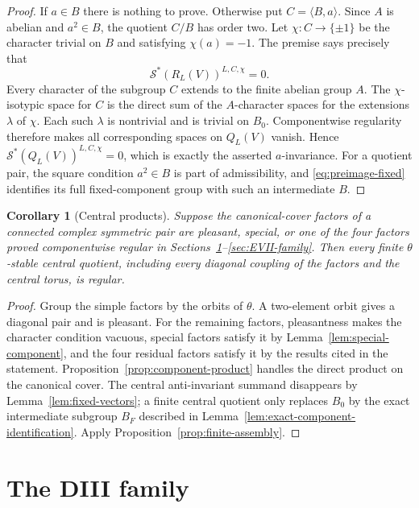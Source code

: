 \documentclass[10pt,a4paper]{amsart}
\numberwithin{equation}{section}
\newtheorem{corollary}[theorem]{Corollary}
\newcommand{\cS}{\mathcal S}
\begin{document}
\begin{proof}
If $a\in B$ there is nothing to prove.  Otherwise put $C=\langle B,a\rangle$.
Since $A$ is abelian and $a^2\in B$, the quotient $C/B$ has order two.  Let
$\chi:C\to\{\pm1\}$ be the character trivial on $B$ and satisfying
$\chi(a)=-1$.  The premise says precisely that
\[
 \cS^*(R_L(V))^{L,C,\chi}=0.
\]
Every character of the subgroup $C$ extends to the finite abelian group $A$.
The $\chi$-isotypic space for $C$ is the direct sum of the $A$-character spaces
for the extensions $\lambda$ of $\chi$.  Each such $\lambda$ is nontrivial and
is trivial on $B_0$.  Componentwise regularity therefore makes all corresponding
spaces on $Q_L(V)$ vanish.  Hence
$\cS^*(Q_L(V))^{L,C,\chi}=0$, which is exactly the asserted $a$-invariance.
For a quotient pair, the square condition $a^2\in B$ is part of admissibility,
and \eqref{eq:preimage-fixed} identifies its full fixed-component group with
such an intermediate $B$.
\end{proof}

\begin{corollary}[Central products]\label{cor:central-products}
Suppose the canonical-cover factors of a connected complex symmetric pair are
pleasant, special, or one of the four factors proved componentwise regular in
Sections~\ref{sec:DIII-family}--\ref{sec:EVII-family}.  Then every finite
$\theta$-stable central quotient, including every diagonal coupling of the
factors and the central torus, is regular.
\end{corollary}

\begin{proof}
Group the simple factors by the orbits of $\theta$.  A two-element orbit gives
a diagonal pair and is pleasant.  For the remaining factors, pleasantness makes
the character condition vacuous, special factors satisfy it by
Lemma~\ref{lem:special-component}, and the four residual factors satisfy it by
the results cited in the statement.  Proposition~\ref{prop:component-product}
handles the direct product on the canonical cover.  The central anti-invariant
summand disappears by Lemma~\ref{lem:fixed-vectors}; a finite central quotient
only replaces $B_0$ by the exact intermediate subgroup $B_F$ described in
Lemma~\ref{lem:exact-component-identification}.  Apply
Proposition~\ref{prop:finite-assembly}.
\end{proof}

\section{The DIII family}\label{sec:DIII-family}
\end{document}

